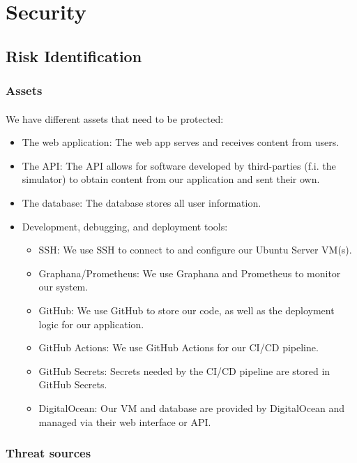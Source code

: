 \section{Security}
\subsection{Risk Identification}
\subsubsection{Assets}
\paragraph{} We have different assets that need to be protected:
\begin{itemize}
	\item The web application: The web app serves and receives content from users.
	\item The API: The API allows for software developed by third-parties (f.i. the simulator) to obtain content from our application and sent their own.
	\item The database: The database stores all user information.
	\item Development, debugging, and deployment tools:
	\begin{itemize}
		\item SSH: We use SSH to connect to and configure our Ubuntu Server VM(s).
		\item Graphana/Prometheus: We use Graphana and Prometheus to monitor our system.
		\item GitHub: We use GitHub to store our code, as well as the deployment logic for our application.
		\item GitHub Actions: We use GitHub Actions for our CI/CD pipeline.
		\item GitHub Secrets: Secrets needed by the CI/CD pipeline are stored in GitHub Secrets.
		\item DigitalOcean: Our VM and database are provided by DigitalOcean and managed via their web interface or API.
	\end{itemize}
\end{itemize}

\subsubsection{Threat sources}

